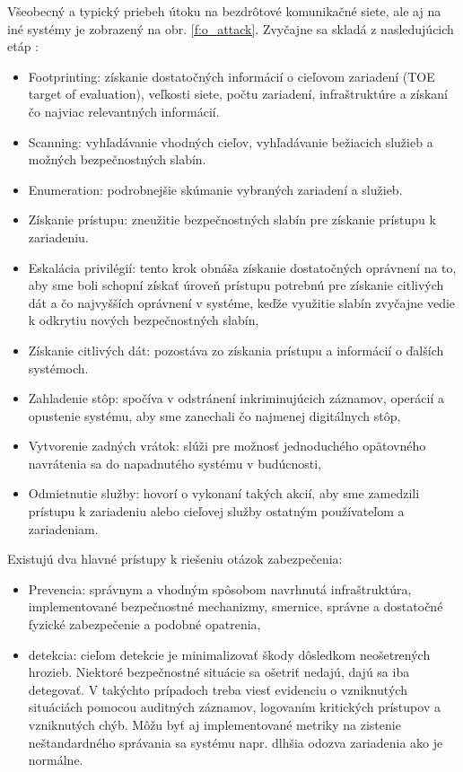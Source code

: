 \documentclass[12pt,a4paper,oneside,openright]{report}
\begin{document}
Všeobecný a typický priebeh útoku na bezdrôtové komunikačné siete, ale aj na iné systémy je zobrazený na obr. \ref{f:o_attack}. Zvyčajne sa skladá z nasledujúcich etáp \cite{bidgoli2006handbook}:

\singlespacing
\begin{itemize}
	\item Footprinting: získanie dostatočných informácií o cieľovom zariadení (TOE target of evaluation), veľkosti siete, počtu zariadení, infraštruktúre a získaní čo najviac relevantných informácií.
	\item Scanning: vyhľadávanie vhodných cieľov, vyhľadávanie bežiacich služieb a možných bezpečnostných slabín.
	\item Enumeration: podrobnejšie skúmanie vybraných zariadení a služieb.
	\item Získanie prístupu: zneužitie bezpečnostných slabín pre získanie prístupu k zariadeniu.
	\item Eskalácia privilégií: tento krok obnáša získanie dostatočných oprávnení na to, aby sme boli schopní získať úroveň prístupu potrebnú pre získanie citlivých dát a čo najvyšších oprávnení v systéme, keďže využitie slabín zvyčajne vedie k odkrytiu nových bezpečnostných slabín,
	\item Získanie citlivých dát: pozostáva zo získania prístupu a informácií o ďalších systémoch.
	\item Zahladenie stôp: spočíva v odstránení inkriminujúcich záznamov, operácií a opustenie systému, aby sme zanechali čo najmenej digitálnych stôp,
	\item Vytvorenie zadných vrátok: slúži pre možnosť jednoduchého opätovného navrátenia sa do napadnutého systému v budúcnosti,
	\item Odmietnutie služby: hovorí o vykonaní takých akcií, aby sme zamedzili prístupu k zariadeniu alebo cieľovej služby ostatným používateľom a zariadeniam.
\end{itemize}

Existujú dva hlavné prístupy k riešeniu otázok zabezpečenia:
\singlespacing
\begin{itemize}
	\item Prevencia: správnym a vhodným spôsobom navrhnutá infraštruktúra, implementované bezpečnostné mechanizmy, smernice, správne a dostatočné fyzické zabezpečenie a podobné opatrenia,
	\item detekcia: cieľom detekcie je minimalizovať škody dôsledkom neošetrených hrozieb. Niektoré bezpečnostné situácie sa ošetriť nedajú, dajú sa iba detegovať. V takýchto prípadoch treba viesť evidenciu o vzniknutých situáciách pomocou auditných záznamov, logovaním kritických prístupov a vzniknutých chýb. Môžu byť aj implementované metriky na zistenie neštandardného správania sa systému napr. dlhšia odozva zariadenia ako je normálne.
\end{itemize}
\onehalfspacing
\end{document}
